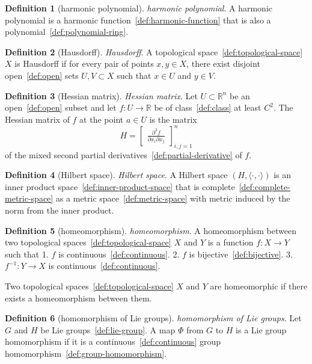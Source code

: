\documentclass[12pt,a4paper]{article}
\theoremstyle{definition}
\newtheorem{definition}{Definition}
\begin{document}
\begin{definition}[harmonic polynomial]\label{def:harmonic-polynomial}
\emph{harmonic polynomial}. A harmonic polynomial is a harmonic function~\ref{def:harmonic-function} that is also a polynomial~\ref{def:polynomial-ring}.
\end{definition}

\begin{definition}[Hausdorff]\label{def:hausdorff}
\emph{Hausdorff}. A topological space~\ref{def:topological-space} $X$ is Hausdorff if for every pair of points $x,y\in X$, there exist disjoint open~\ref{def:open} sets $U,V\subset X$ such that $x\in U$ and $y\in V$.
\end{definition}

\begin{definition}[Hessian matrix]\label{def:hessian-matrix}
\emph{Hessian matrix}. Let $U\subset\mathbb R^n$ be an open~\ref{def:open} subset and let $f:U\to\mathbb R$ be of class~\ref{def:class} at least $C^2$. The Hessian matrix of $f$ at the point $a \in U$ is the matrix 
$$H = \begin{bmatrix} \frac{\partial^2 f}{\partial x_i\partial x_j} \end{bmatrix}_{i,j=1}^n$$ of the mixed second partial derivatives~\ref{def:partial-derivative} of $f$.
\end{definition}

\begin{definition}[Hilbert space]\label{def:hilbert-space}
\emph{Hilbert space}. A Hilbert space $(H, \langle\cdot,\cdot\rangle)$ is an inner product space~\ref{def:inner-product-space} that is complete~\ref{def:complete-metric-space} as a metric space~\ref{def:metric-space} with metric induced by the norm from the inner product.
\end{definition}

\begin{definition}[homeomorphism]\label{def:homeomorphism}
\emph{homeomorphism}. A homeomorphism between two topological spaces~\ref{def:topological-space} $X$ and $Y$ is a function $f: X\to Y$ such that 
1. $f$ is continuous~\ref{def:continuous}.
2. $f$ is bijective~\ref{def:bijective}.
3. $f^{-1}:Y\to X$ is continuous~\ref{def:continuous}.

Two topological spaces~\ref{def:topological-space} $X$ and $Y$ are homeomorphic if there exists a homeomorphism between them.
\end{definition}

\begin{definition}[homomorphism of Lie groups]\label{def:homomorphism-of-lie-groups}
\emph{homomorphism of Lie groups}. Let $G$ and $H$ be Lie groups~\ref{def:lie-group}. A map $\Phi$ from $G$ to $H$ is a Lie group homomorphism if it is a continuous~\ref{def:continuous} group homomorphism~\ref{def:group-homomorphism}.
\end{definition}
\end{document}
